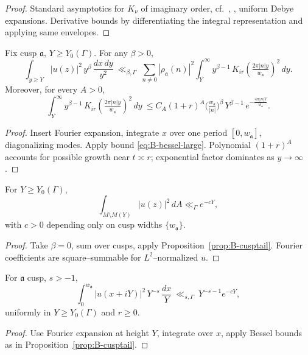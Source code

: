\begin{proof}
Standard asymptotics for $K_\nu$ of imaginary order, cf.\ \cite[§10.25]{DLMF},
\cite[§6.20]{Watson}, uniform Debye expansions. Derivative bounds by differentiating
the integral representation and applying same envelopes.
\end{proof}

\begin{proposition}
\label{prop:B-cusptail}
Fix cusp $\mathfrak a$, $Y\ge Y_0(\Gamma)$. For any $\beta>0$,
\[
\int_{y\ge Y}|u(z)|^2\,y^\beta\,\frac{dx\,dy}{y^2}
\ \ll_{\beta,\Gamma}\ \sum_{n\ne0}|\rho_{\mathfrak a}(n)|^2
\int_Y^\infty y^{\beta-1}\,K_{ir}\!\left(\tfrac{2\pi|n|y}{w_{\mathfrak a}}\right)^{\!2}\,dy.
\]
Moreover, for every $A>0$,
\[
\int_Y^\infty y^{\beta-1}\,K_{ir}\!\left(\tfrac{2\pi|n|y}{w_{\mathfrak a}}\right)^{\!2}\,dy
\ \le C_A(1+r)^A\Big(\tfrac{w_{\mathfrak a}}{|n|}\Big)^{\beta}\,
Y^{\beta-1}\,e^{-\tfrac{4\pi |n|Y}{w_{\mathfrak a}}}.
\]
\end{proposition}

\begin{proof}
Insert Fourier expansion, integrate $x$ over one period $[0,w_{\mathfrak a}]$,
diagonalizing modes. Apply bound \eqref{eq:B-bessel-large}. Polynomial $(1+r)^A$
accounts for possible growth near $t\asymp r$; exponential factor dominates as $y\to\infty$.
\end{proof}

\begin{corollary}
\label{cor:B-cuspL2}
For $Y\ge Y_0(\Gamma)$,
\[
\int_{M\setminus M(Y)}|u(z)|^2\,dA \ll_\Gamma e^{-cY},
\]
with $c>0$ depending only on cusp widths $\{w_{\mathfrak a}\}$.
\end{corollary}

\begin{proof}
Take $\beta=0$, sum over cusps, apply Proposition~\ref{prop:B-cusptail}.
Fourier coefficients are square–summable for $L^2$–normalized $u$.
\end{proof}

\begin{lemma}
\label{lem:B-horo}
For $\mathfrak a$ cusp, $s>-1$,
\[
\int_{0}^{w_{\mathfrak a}} |u(x+iY)|^2\,Y^{-s}\,\frac{dx}{Y}
\ \ll_{s,\Gamma}\ Y^{-s-1} e^{-cY},
\]
uniformly in $Y\ge Y_0(\Gamma)$ and $r\ge0$.
\end{lemma}

\begin{proof}
Use Fourier expansion at height $Y$, integrate over $x$, apply Bessel bounds
as in Proposition~\ref{prop:B-cusptail}.
\end{proof}

